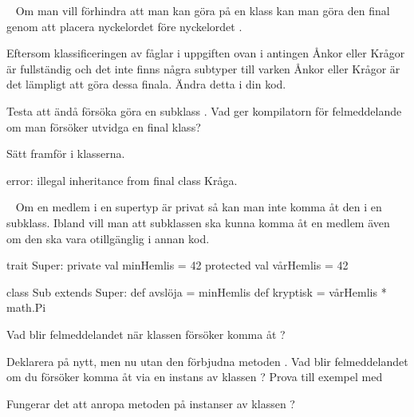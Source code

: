 
\QUESTBEGIN

\Task  \what~  Om man vill förhindra att man kan göra  på en klass kan man göra den final genom att placera nyckelordet  före nyckelordet .

\Subtask Eftersom klassificeringen av fåglar i uppgiften ovan i antingen Ånkor eller Krågor är fullständig och det inte finns några subtyper till varken Ånkor eller Krågor är det lämpligt att göra dessa finala. Ändra detta i din kod.

\Subtask Testa att ändå försöka göra en subklass . Vad ger kompilatorn för felmeddelande om man försöker utvidga en final klass?


\SOLUTION


\TaskSolved \what


\SubtaskSolved  Sätt  framför  i klasserna.

\SubtaskSolved  error: illegal inheritance from final class Kråga.


\QUESTEND







\QUESTBEGIN

\Task  \what~  Om en medlem i en supertyp är privat så kan man inte komma åt den i en subklass. Ibland vill man att subklassen ska kunna komma åt en medlem även om den ska vara otillgänglig i annan kod.

\begin{Code}
trait Super:
  private val minHemlis = 42
  protected val vårHemlis = 42

class Sub extends Super:
  def avslöja = minHemlis
  def kryptisk = vårHemlis * math.Pi

\end{Code}

\Subtask Vad blir felmeddelandet när klassen  försöker komma åt ?

\Subtask Deklarera  på nytt, men nu utan den förbjudna metoden . Vad blir felmeddelandet om du försöker komma åt  via en instans av klassen ? Prova till exempel med 

\Subtask Fungerar det att anropa metoden  på instanser av klassen ?

